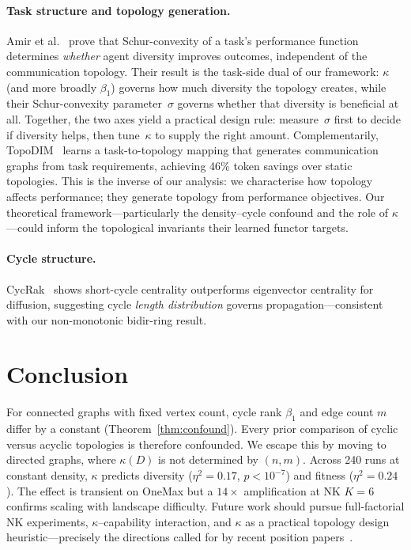 \documentclass{llncs}
\begin{document}
\paragraph{Task structure and topology generation.}
Amir et al.~\cite{amir2025schur} prove that Schur-convexity of a task's
performance function determines \emph{whether} agent diversity improves
outcomes, independent of the communication topology. Their result is the
task-side dual of our framework: $\kappa$ (and more broadly $\beta_1$)
governs how much diversity the topology creates, while their Schur-convexity
parameter~$\sigma$ governs whether that diversity is beneficial at all.
Together, the two axes yield a practical design rule: measure~$\sigma$ first
to decide if diversity helps, then tune~$\kappa$ to supply the right amount.
Complementarily, TopoDIM~\cite{topodim2025} learns a task-to-topology mapping
that generates communication graphs from task requirements, achieving 46\%
token savings over static topologies. This is the inverse of our analysis:
we characterise how topology affects performance; they generate topology from
performance objectives. Our theoretical framework---particularly the
density--cycle confound and the role of $\kappa$---could inform the
topological invariants their learned functor targets.

\paragraph{Cycle structure.}
CycRak~\cite{cycrak2024} shows short-cycle centrality outperforms eigenvector
centrality for diffusion, suggesting cycle \emph{length distribution} governs
propagation---consistent with our non-monotonic bidir-ring result.

\section{Conclusion}
\label{sec:conclusion}

For connected graphs with fixed vertex count, cycle rank $\beta_1$ and edge
count $m$ differ by a constant (Theorem~\ref{thm:confound}). Every prior
comparison of cyclic versus acyclic topologies is therefore confounded. We
escape this by moving to directed graphs, where $\kappa(D)$ is not determined
by $(n, m)$. Across 240 runs at constant density, $\kappa$ predicts diversity
($\eta^2 = 0.17$, $p < 10^{-7}$) and fitness ($\eta^2 = 0.24$). The effect is
transient on OneMax but a $14\times$ amplification at NK $K = 6$ confirms
scaling with landscape difficulty. Future work should pursue full-factorial NK
experiments, $\kappa$--capability interaction, and $\kappa$ as a practical
topology design heuristic---precisely the directions called for by recent
position papers~\cite{yang2025topology}.



\end{document}
